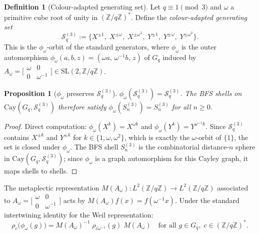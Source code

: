 \documentclass[11pt,a4paper]{article}
\newtheorem{proposition}[theorem]{Proposition}
\theoremstyle{definition}
\newtheorem{definition}[theorem]{Definition}
\theoremstyle{remark}
\newcommand{\Gq}{G_q}
\newcommand{\Z}{\mathbb{Z}}
\newcommand{\Sq}{\mathcal{S}_q}
\begin{document}
      \begin{definition}[Colour-adapted generating set]
        \label{def:color-adapted-gen-set}
        Let $q \equiv 1 \pmod{3}$ and $\omega$ a primitive cube root of unity in $(\Z/q\Z)^*$.
        Define the \emph{colour-adapted generating set}
        \begin{equation}
          \label{eq:color-adapted}
          \Sq^{(3)} := \bigl\{X^{\pm 1},\; X^{\pm\omega},\; X^{\pm\omega^2},\;
          Y^{\pm 1},\; Y^{\pm\omega},\; Y^{\pm\omega^2}\bigr\}.
        \end{equation}
        This is the $\phi_\omega$-orbit of the standard generators, where $\phi_\omega$ is the outer
        automorphism $\phi_\omega(a,b,z) = (\omega a,\, \omega^{-1} b,\, z)$ of $\Gq$ induced by
        $A_\omega = \bigl[\begin{smallmatrix}\omega & 0 \\ 0 & \omega^{-1}\end{smallmatrix}\bigr]
        \in \mathrm{SL}(2,\Z/q\Z)$.
      \end{definition}

      \begin{proposition}[$\phi_\omega$ preserves $\Sq^{(3)}$]
        \label{prop:phi-preserves-gen}
        $\phi_\omega(\Sq^{(3)}) = \Sq^{(3)}$.
        The BFS shells on $\mathrm{Cay}(\Gq, \Sq^{(3)})$ therefore satisfy
        $\phi_\omega(S_n^{(3)}) = S_n^{(3)}$ for all $n \geq 0$.
      \end{proposition}

      \begin{proof}
        Direct computation: $\phi_\omega(X^k) = X^{\omega k}$ and $\phi_\omega(Y^k) = Y^{\omega^{-1}k}$.
        Since $\Sq^{(3)}$ contains $X^{\pm k}$ and $Y^{\pm k}$ for $k \in \{1, \omega, \omega^2\}$,
        which is exactly the $\omega$-orbit of $\{1\}$, the set is closed under $\phi_\omega$.
        The BFS shell $S_n^{(3)}$ is the combinatorial distance-$n$ sphere in
        $\mathrm{Cay}(\Gq, \Sq^{(3)})$; since $\phi_\omega$ is a graph automorphism for this Cayley
        graph, it maps shells to shells.
      \end{proof}

      The metaplectic representation $M(A_\omega): L^2(\Z/q\Z) \to L^2(\Z/q\Z)$ associated to
      $A_\omega = \bigl[\begin{smallmatrix}\omega & 0 \\ 0 & \omega^{-1}\end{smallmatrix}\bigr]$
      acts by $M(A_\omega)f(x) = f(\omega^{-1}x)$.
      Under the standard intertwining identity for the Weil representation:
      \begin{equation}
        \label{eq:metaplectic-intertwining}
        \rho_c\bigl(\phi_\omega(g)\bigr) = M(A_\omega)^{-1}\;\rho_{c\omega^{-1}}(g)\;M(A_\omega)
        \quad\text{for all } g \in \Gq,\; c \in (\Z/q\Z)^*.
      \end{equation}
\end{document}
